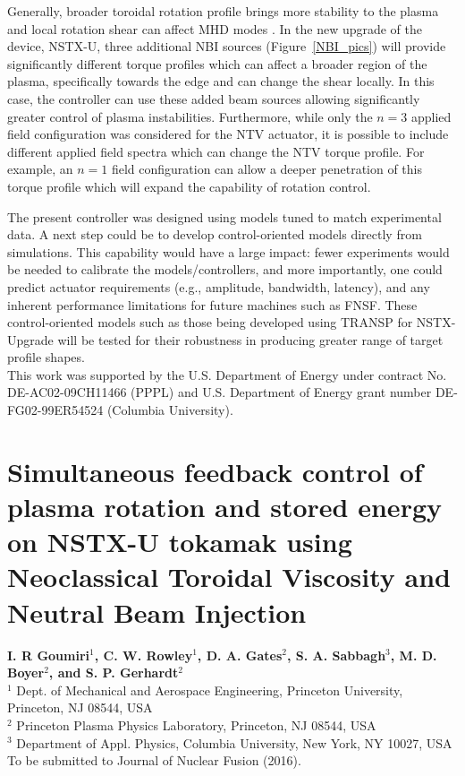 \documentclass[12pt,lot, lof]{puthesis}
\begin{document}
Generally, broader toroidal rotation profile brings more stability to the plasma \cite{Sabbagh10} and local rotation shear can affect MHD modes  \cite{Gerhardt09}. In the new upgrade of the device, NSTX-U, three additional NBI sources (Figure~{\ref{NBI_pics}}) will provide significantly different torque profiles which can affect a broader region of the plasma, specifically towards the edge and can change the shear locally. In this case, the controller can use these added beam sources allowing significantly greater control of plasma instabilities.
Furthermore, while only the $n = 3$ applied field configuration was considered for the NTV actuator, it is possible to include different applied field spectra which can change the NTV torque profile. For example, an $n=1$ field configuration can allow a deeper penetration of this torque profile which will expand the capability of rotation control.

The present controller was designed using models tuned to match experimental data. A next step could be to develop control-oriented models directly from simulations. This capability would have a large impact: fewer experiments would be needed to calibrate the models/controllers, and more importantly, one could predict actuator requirements (e.g., amplitude, bandwidth, latency), and any inherent performance limitations for future machines such as FNSF.
These control-oriented models such as those being developed using TRANSP for NSTX-Upgrade will be tested for their robustness in producing greater range of target profile shapes. \\

%
This work was supported by the U.S. Department of Energy under contract No. DE-AC02-09CH11466 (PPPL) and U.S. Department of Energy  grant number DE-FG02-99ER54524 (Columbia University). 


\chapter{Simultaneous feedback control of plasma rotation and stored energy on NSTX-U tokamak using Neoclassical Toroidal Viscosity and Neutral Beam Injection}
\label{rot2&}


\textbf{\large I. R Goumiri$^1$, C. W. Rowley$^1$, D. A. Gates$^2$, S. A. Sabbagh$^3$,  M. D. Boyer$^2$, and S. P. Gerhardt$^2$} \\
{\footnotesize $^1$ Dept. of Mechanical and Aerospace Engineering, Princeton University, Princeton, NJ 08544, USA \\[-0.1em]
$^2$ Princeton Plasma Physics Laboratory, Princeton, NJ 08544, USA \\[-0.1em]
$^3$ Department of Appl. Physics, Columbia University, New York, NY 10027, USA \\[-0.1em]}
{\footnotesize To be submitted to Journal of Nuclear Fusion (2016).} \\
\end{document}

